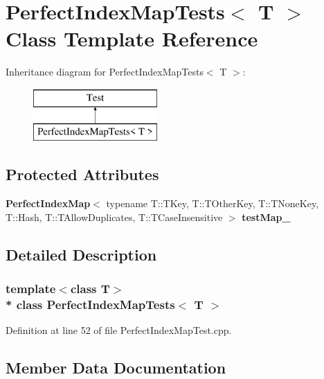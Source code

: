 \section{Perfect\+Index\+Map\+Tests$<$ T $>$ Class Template Reference}
\label{classPerfectIndexMapTests}
Inheritance diagram for Perfect\+Index\+Map\+Tests$<$ T $>$\+:\begin{figure}[H]
\begin{center}
\leavevmode
\includegraphics[height=2.000000cm]{classPerfectIndexMapTests}
\end{center}
\end{figure}
\subsection*{Protected Attributes}
\begin{DoxyCompactItemize}
\item 
{\bf Perfect\+Index\+Map}$<$ typename T\+::\+T\+Key, T\+::\+T\+Other\+Key, T\+::\+T\+None\+Key, T\+::\+Hash, T\+::\+T\+Allow\+Duplicates, T\+::\+T\+Case\+Insensitive $>$ {\bf test\+Map\+\_\+}
\end{DoxyCompactItemize}


\subsection{Detailed Description}
\subsubsection*{template$<$class T$>$\\*
class Perfect\+Index\+Map\+Tests$<$ T $>$}



Definition at line 52 of file Perfect\+Index\+Map\+Test.\+cpp.



\subsection{Member Data Documentation}
